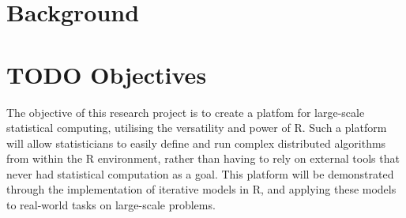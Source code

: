 \documentclass[a4paper,10pt]{article}
\begin{document}

\tableofcontents
\newpage
\section{Background}



\section{TODO Objectives}

 The objective of this research project is to create a platfom for large-scale
 statistical computing, utilising the versatility and power of R.
 Such a platform will allow statisticians to easily define and run complex
 distributed algorithms from within the R environment, rather than having to
 rely on external tools that never had statistical computation as a goal.
 This platform will be demonstrated through the implementation of iterative
 models in R, and applying these models to real-world tasks on large-scale
 problems.
\end{document}
